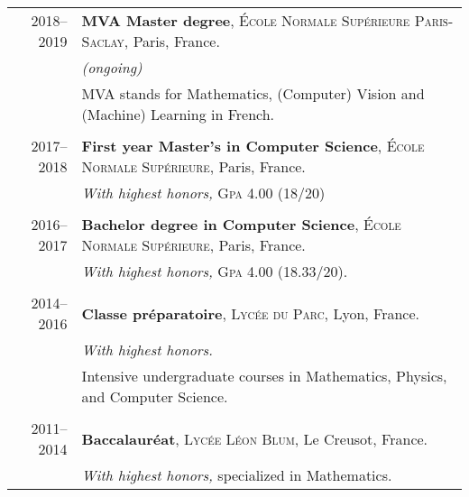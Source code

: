 \documentclass[a4paper,10pt]{article} %
\begin{document}
\begin{tabular}{r|l}
  2018--2019 & \textbf{MVA Master degree}, \textsc{\'Ecole Normale Supérieure Paris-Saclay}, Paris, France.\\
             & \emph{(ongoing)}\\
             & MVA stands for Mathematics, (Computer) Vision and (Machine) Learning in French. \\
\multicolumn{2}{c}{} \\

  2017--2018 & \textbf{First year Master's in Computer Science}, \textsc{\'Ecole Normale Supérieure}, Paris, France.\\
             & \emph{With highest honors,} \textsc{Gpa} 4.00 (18/20)\\
\multicolumn{2}{c}{} \\

  2016--2017 & \textbf{Bachelor degree in Computer Science}, \textsc{\'Ecole Normale Supérieure}, Paris, France.\\
             & \emph{With highest honors,} \textsc{Gpa} 4.00 (18.33/20). \\
\multicolumn{2}{c}{} \\

  2014--2016 & \textbf{Classe préparatoire}, \textsc{Lycée du Parc}, Lyon, France. \\
             & \emph{With highest honors.} \\
             & Intensive undergraduate courses in Mathematics, Physics, and Computer Science.\\
\multicolumn{2}{c}{} \\

  2011--2014 & \textbf{Baccalauréat}, \textsc{Lycée Léon Blum}, Le Creusot, France. \\
             & \emph{With highest honors,} specialized in Mathematics. \\
\end{tabular}



\end{document}

